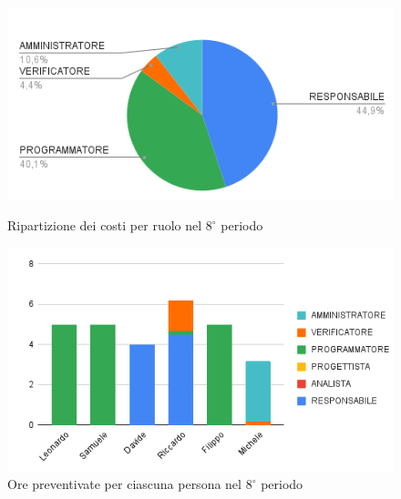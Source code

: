 \begin{figure}[H]
  \centering
  \includegraphics[width=0.6\linewidth]{grafici/8_periodo_torta.png}
  \caption{Ripartizione dei costi per ruolo nel $8^\circ$ periodo}
        \vspace{5mm}
  \includegraphics[width=0.7\linewidth]{grafici/8_periodo_istogramma.png}
  \caption{Ore preventivate per ciascuna persona nel $8^\circ$ periodo}
\end{figure}

